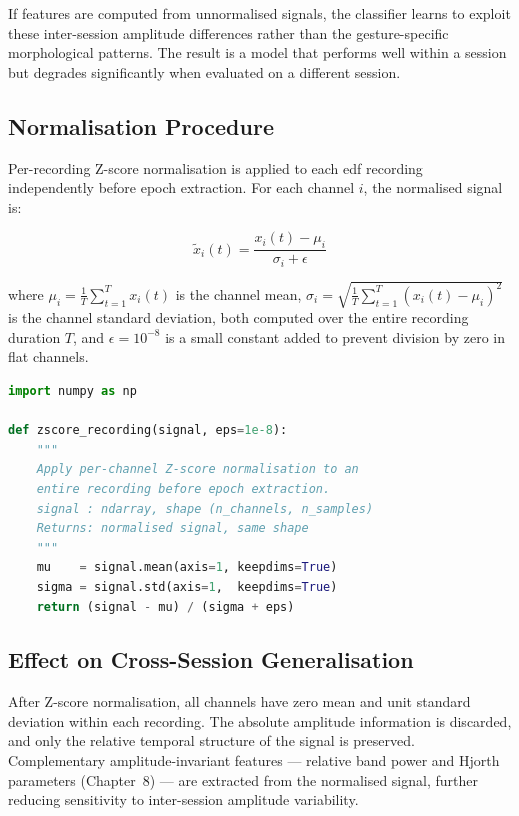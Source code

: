 If features are computed from unnormalised signals, the
classifier learns to exploit these inter-session amplitude
differences rather than the gesture-specific morphological
patterns. The result is a model that performs well within
a session but degrades significantly when evaluated on a
different session.

\subsection{Normalisation Procedure}

Per-recording Z-score normalisation is applied to each
\acrshort{edf} recording independently before epoch extraction.
For each channel $i$, the normalised signal is:

\begin{equation}
\tilde{x}_i(t) = \frac{x_i(t) - \mu_i}{\sigma_i + \epsilon}
\label{eq:zscore}
\end{equation}

\noindent where $\mu_i = \frac{1}{T}\sum_{t=1}^{T} x_i(t)$
is the channel mean, $\sigma_i = \sqrt{\frac{1}{T}
\sum_{t=1}^{T}(x_i(t) - \mu_i)^2}$ is the channel standard
deviation, both computed over the entire recording duration $T$,
and $\epsilon = 10^{-8}$ is a small constant added to prevent
division by zero in flat channels.

\begin{lstlisting}[language=Python,
    caption={Per-recording Z-score normalisation.},
    label={lst:zscore}]
import numpy as np

def zscore_recording(signal, eps=1e-8):
    """
    Apply per-channel Z-score normalisation to an
    entire recording before epoch extraction.
    signal : ndarray, shape (n_channels, n_samples)
    Returns: normalised signal, same shape
    """
    mu    = signal.mean(axis=1, keepdims=True)
    sigma = signal.std(axis=1,  keepdims=True)
    return (signal - mu) / (sigma + eps)
\end{lstlisting}

\subsection{Effect on Cross-Session Generalisation}

After Z-score normalisation, all channels have zero mean and
unit standard deviation within each recording. The absolute
amplitude information is discarded, and only the relative
temporal structure of the signal is preserved. Complementary
amplitude-invariant features — relative band power and Hjorth
parameters (Chapter~8) — are extracted from the normalised
signal, further reducing sensitivity to inter-session
amplitude variability.

